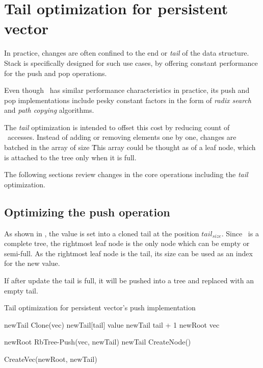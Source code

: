 \section{Tail optimization for persistent vector}

In practice, changes are often confined to the end or \emph{tail} of the data structure. Stack is specifically designed for such use cases, by offering constant performance for the push and pop operations. 

Even though \rbtree\ has similar performance characteristics in practice, its push and pop implementations include pesky constant factors in the form of \emph{radix search} and \emph{path copying} algorithms. 

The \emph{tail} optimization is intended to offset this cost by reducing count of \rbtree\ accesses. Instead of adding or removing elements one by one, changes are batched in the array of size \m\. This array could be thought as of  a leaf node, which is attached to the tree only when it is full. 

The following sections review changes in the core operations including the \emph{tail} optimization. 

\subsection*{Optimizing the push operation}
As shown in , the value is set into a cloned tail at the position $tail_{size}$. Since \rbtree\ is a complete tree, the rightmost leaf node is the only node which can be empty or semi-full. As the rightmost leaf node is the tail, its size can be used as an index for the new value.

If after update the tail is full, it will be pushed into a tree and replaced with an empty tail. 

\begin{listing}[ht!]        
    \caption{Tail optimization for persistent vector’s push implementation}
    \label{lst:pvec-push}
    
    \begin{algorithmic}
        \State newTail \la Clone(vec)
        \State newTail[tail] \la value
        \State newTail \la tail + 1
        \State newRoot \la vec
            
            \State newRoot \la RbTree-Push(vec, newTail)
            \State newTail \la CreateNode()
        \EndIf
        
        \State \Return CreateVec(newRoot, newTail)
        \EndFunction
    \end{algorithmic}
\end{listing}

